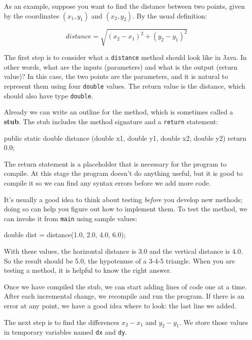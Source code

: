\documentclass[12pt]{book}
\theoremstyle{exercise}
\newcommand{\java}[1]{\verb"#1"}
\begin{document}
As an example, suppose you want to find the distance between two points, given by the coordinates $(x_1, y_1)$ and $(x_2, y_2)$.
By the usual definition:

\[ distance = \sqrt{(x_2 - x_1)^2 +(y_2 - y_1)^2} \]

The first step is to consider what a \java{distance} method should look like in Java.
In other words, what are the inputs (parameters) and what is the output (return value)?
In this case, the two points are the parameters, and it is natural to represent them using four \java{double} values.
The return value is the distance, which should also have type \java{double}.


Already we can write an outline for the method, which is sometimes called a {\bf stub}.
The stub includes the method signature and a \java{return} statement:

\begin{code}
    public static double distance
            (double x1, double y1, double x2, double y2) {
        return 0.0;
    }
\end{code}

The return statement is a placeholder that is necessary for the program to compile.
At this stage the program doesn't do anything useful, but it is good to compile it so we can find any syntax errors before we add more code.

It's usually a good idea to think about testing {\it before} you develop new methods; doing so can help you figure out how to implement them.
To test the method, we can invoke it from \java{main} using sample values:

\begin{code}
    double dist = distance(1.0, 2.0, 4.0, 6.0);
\end{code}

With these values, the horizontal distance is 3.0 and the vertical distance is 4.0.
So the result should be 5.0, the hypotenuse of a 3-4-5 triangle.
When you are testing a method, it is helpful to know the right answer.

Once we have compiled the stub, we can start adding lines of code one at a time.
After each incremental change, we recompile and run the program.
If there is an error at any point, we have a good idea where to look: the last line we added.

The next step is to find the differences $x_2 - x_1$ and $y_2 - y_1$.
We store those values in temporary variables named \java{dx} and \java{dy}.
\end{document}
